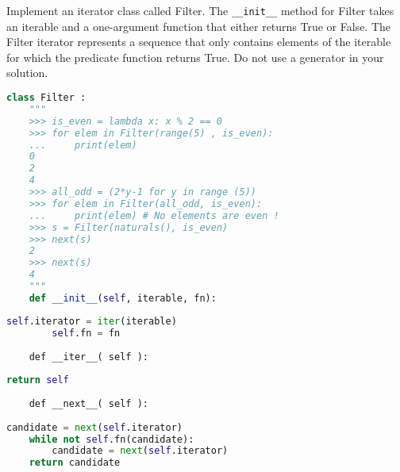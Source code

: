 \question
Implement an iterator class called Filter. The \texttt{\_\_init\_\_} method for
Filter takes an iterable and a one-argument function that either returns True
or False. The Filter iterator represents a sequence that only contains elements
of the iterable for which the predicate function returns True. Do not use a
generator in your solution.

\begin{lstlisting}[language=Python]
class Filter :
    """
    >>> is_even = lambda x: x % 2 == 0
    >>> for elem in Filter(range(5) , is_even):
    ...     print(elem)
    0
    2
    4
    >>> all_odd = (2*y-1 for y in range (5))
    >>> for elem in Filter(all_odd, is_even):
    ...     print(elem) # No elements are even !
    >>> s = Filter(naturals(), is_even)
    >>> next(s)
    2
    >>> next(s)
    4
    """
    def __init__(self, iterable, fn):
\end{lstlisting}
\begin{solution}[1.25in]
\begin{lstlisting}[language=Python]
        self.iterator = iter(iterable)
        self.fn = fn
\end{lstlisting}
\end{solution}
\begin{lstlisting}
    def __iter__( self ):
\end{lstlisting}
\begin{solution}[.75in]
\begin{lstlisting}[language=Python]
    return self
\end{lstlisting}
\end{solution}
\begin{lstlisting}
    def __next__( self ):
\end{lstlisting}
\begin{solution}[.75in]
\begin{lstlisting}[language=Python]
    candidate = next(self.iterator)
    while not self.fn(candidate):
        candidate = next(self.iterator)
    return candidate
\end{lstlisting}
\end{solution}
